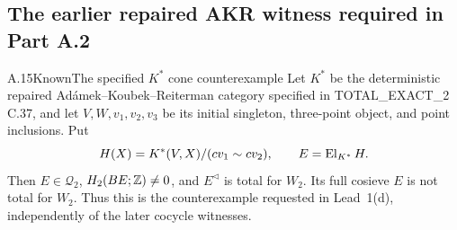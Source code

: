 \subsection{The earlier repaired AKR witness required in Part A.2}

\begin{claim}{A.15}{Known}{The specified $K^*$ cone counterexample}\label{A:Kstar-cone}
Let $K^*$ be the deterministic repaired Ad\'amek--Koubek--Reiterman category specified in TOTAL\_EXACT\_2 C.37, and let $V,W,v_1,v_2,v_3$ be its initial singleton, three-point object, and point inclusions. Put
\[
 H(X)=K^*(V,X)/(cv_1\sim cv_2),\qquad
 E=\operatorname{El}_{K^*}H.
\]
Then $E\in\mathcal Q_2$, $H_2(BE;\mathbb Z)\ne0$, and $E^{\triangleleft}$ is total for $W_2$. Its full cosieve $E$ is not total for $W_2$. Thus this is the counterexample requested in Lead~1(d), independently of the later cocycle witnesses.
\end{claim}
